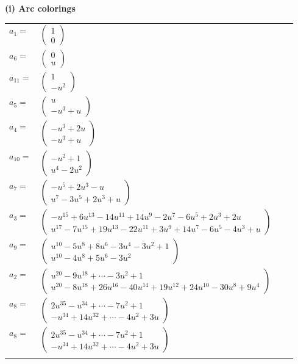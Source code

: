 \documentclass[1p]{elsarticle_modified}
\theoremstyle{definition}
\begin{document}
\flushleft \textbf{(i) Arc colorings}\\
\begin{tabular}{m{7pt} m{180pt} m{7pt} m{180pt} }
\flushright $a_{1}=$&$\begin{pmatrix}1\\0\end{pmatrix}$ \\
\flushright $a_{6}=$&$\begin{pmatrix}0\\u\end{pmatrix}$ \\
\flushright $a_{11}=$&$\begin{pmatrix}1\\- u^2\end{pmatrix}$ \\
\flushright $a_{5}=$&$\begin{pmatrix}u\\- u^3+u\end{pmatrix}$ \\
\flushright $a_{4}=$&$\begin{pmatrix}- u^3+2 u\\- u^3+u\end{pmatrix}$ \\
\flushright $a_{10}=$&$\begin{pmatrix}- u^2+1\\u^4-2 u^2\end{pmatrix}$ \\
\flushright $a_{7}=$&$\begin{pmatrix}- u^5+2 u^3- u\\u^7-3 u^5+2 u^3+u\end{pmatrix}$ \\
\flushright $a_{3}=$&$\begin{pmatrix}- u^{15}+6 u^{13}-14 u^{11}+14 u^9-2 u^7-6 u^5+2 u^3+2 u\\u^{17}-7 u^{15}+19 u^{13}-22 u^{11}+3 u^9+14 u^7-6 u^5-4 u^3+u\end{pmatrix}$ \\
\flushright $a_{9}=$&$\begin{pmatrix}u^{10}-5 u^8+8 u^6-3 u^4-3 u^2+1\\u^{10}-4 u^8+5 u^6-3 u^2\end{pmatrix}$ \\
\flushright $a_{2}=$&$\begin{pmatrix}u^{20}-9 u^{18}+\cdots-3 u^2+1\\u^{20}-8 u^{18}+26 u^{16}-40 u^{14}+19 u^{12}+24 u^{10}-30 u^8+9 u^4\end{pmatrix}$ \\
\flushright $a_{8}=$&$\begin{pmatrix}2 u^{35}- u^{34}+\cdots-7 u^2+1\\- u^{34}+14 u^{32}+\cdots-4 u^2+3 u\end{pmatrix}$\\ \flushright $a_{8}=$&$\begin{pmatrix}2 u^{35}- u^{34}+\cdots-7 u^2+1\\- u^{34}+14 u^{32}+\cdots-4 u^2+3 u\end{pmatrix}$\\&\end{tabular}
\end{document}
